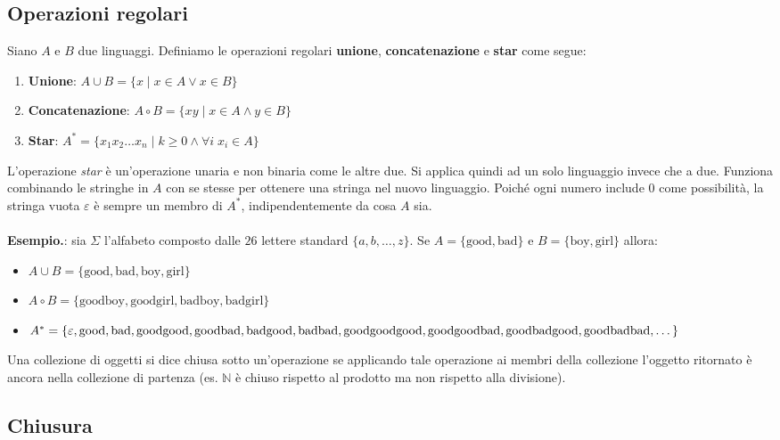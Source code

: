 \documentclass[italian]{article}
\newcommand{\taleche}{\;|\;}
\newcommand{\example}{\noindent\textbf{Esempio.\quad}}
\begin{document}
\subsection{Operazioni regolari}
Siano $A$ e $B$ due linguaggi. Definiamo le operazioni regolari \textbf{unione}, \textbf{concatenazione} e \textbf{star} come segue:
\begin{enumerate}
	\item \textbf{Unione}: $A \cup B = \{ x \taleche x \in A  \lor x \in B \}$
	\item \textbf{Concatenazione}: $A \circ B = \{ xy \taleche x \in A  \land y \in B \}$
	\item \textbf{Star}: $A^* = \{ x_1x_2\dots x_n \taleche k \geq 0 \land \forall i \; x_i \in A \}$
\end{enumerate} 
L'operazione \textit{star} è un'operazione unaria e non binaria come le altre due. Si applica quindi ad un solo linguaggio invece che a due. Funziona combinando le stringhe in $A$ con se stesse per ottenere una stringa nel nuovo linguaggio. Poiché ogni numero include $0$ come possibilità, la stringa vuota $\varepsilon$ è sempre un membro di $A^*$, indipendentemente da cosa $A$ sia.\\\\
\example: sia $\Sigma$ l'alfabeto composto dalle $26$ lettere standard $\{ a,b,\dots,z \}$. Se $A = \{ \text{good},\text{bad} \}$ e $B = \{ \text{boy},\text{girl} \}$ allora:
\begin{itemize}[label={}]
	\item $A \cup B = \{ \text{good},\text{bad}, \text{boy},\text{girl} \}$
	\item $A \circ B = \{ \text{goodboy},\text{goodgirl},\text{badboy}, \text{badgirl} \}$
	\item $A^* = \{ \varepsilon, \text{good},\text{bad},\text{goodgood}, \text{goodbad}, \text{badgood}, \\ \text{badbad}, \text{goodgoodgood}, \text{goodgoodbad}, \text{goodbadgood}, \text{goodbadbad}, \dots \}$
\end{itemize}
Una collezione di oggetti si dice chiusa sotto un'operazione se applicando tale operazione ai membri della collezione l'oggetto ritornato è ancora nella collezione di partenza (es. $\mathbb{N}$ è chiuso rispetto al prodotto ma non rispetto alla divisione).

\subsection{Chiusura}
\end{document}
